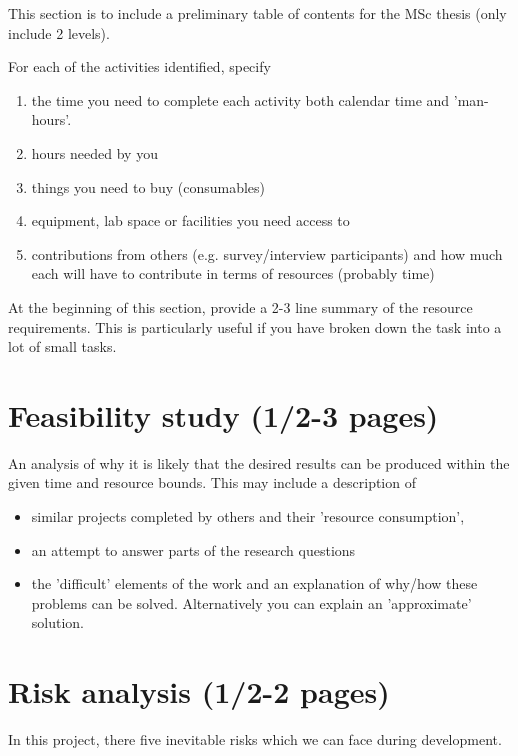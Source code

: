 \documentclass[informationsecurity]{gucmasterproject}
\begin{document}
This section is to include a preliminary table of contents for the MSc thesis
(only include 2 levels).

For each of the activities identified, specify
\begin{enumerate}
\item  the time you need to complete each activity both calendar time and 'man-hours'.
\item  hours needed by you
\item  things you need to buy (consumables)
\item  equipment, lab space or facilities you need access to
\item  contributions from others (e.g. survey/interview participants) and how much each will have to contribute in terms of resources (probably time)
\end{enumerate}
At the beginning of this section, provide a 2-3 line summary of the
resource requirements.  This is particularly useful if you have broken
down the task into a lot of small tasks.

\chapter{Feasibility study (1/2-3 pages)}



An analysis of why it is likely that the desired
results can be produced within the given time and
resource bounds.  This may include a description of
\begin{itemize}
\item similar projects completed by others and their 'resource consumption',
\item an attempt to answer parts of the research questions
\item the 'difficult' elements of the work and an explanation of why/how these problems can be solved.  
Alternatively you can explain an 'approximate' solution.
\end{itemize}

\chapter{Risk analysis (1/2-2 pages)}
In this project, there five inevitable risks which we can face during development.
\end{document}
